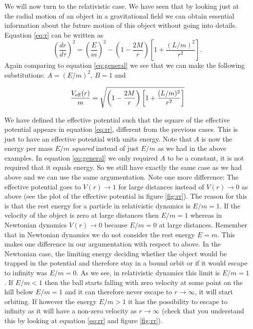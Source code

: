 \begin{multicols}{2}
We will now turn to the relativistic case. We have seen that by looking just at the radial motion of an object in a gravitational field we can obtain essential information about the future motion of this object without going into details. Equation \ref{eq:r} can be written as
\begin{equation}
\label{eq:rr}
\left(\frac{dr}{d\tau}\right)^2=\left(\frac{E}{m}\right)^2-\left(1-\frac{2M}{r}\right)\left[1+\frac{(L/m)^2}{r^2}\right].
\end{equation}
Again comparing to equation \ref{eq:general} we see that we can make the following substitutions: $A=(E/m)^2$, $B=1$ and
\begin{formbox}
\[
\frac{V_{\rm eff}(r)}{m}=\sqrt{\left(1-\frac{2M}{r}\right)\left[1+\frac{(L/m)^2}{r^2}\right]}
\]
\end{formbox}
We have defined the effective potential such that the square of the effective potential appears in equation \ref{eq:rr}, different from the previous cases. This is just to have an effective potential with units energy. Note that $A$ is now the energy per mass $E/m$ {\it squared} instead of just $E/m$ as we had in the above examples. In equation \ref{eq:general} we only required $A$ to be a constant, it is not required that it equals energy. So we still have exactly the same case as we had above and we can use the same argumentation. Note one more difference: The effective potential goes to $V(r)\rightarrow1$ for large distances instead of $V(r)\rightarrow0$ as above (see the plot of the effective potential in figure \ref{fig:rr}). The reason for this is that the rest energy for a particle in relativistic dynamics is $E/m=1$. If the velocity of the object is zero at large distances then $E/m=1$ whereas in Newtonian dynamics $V(r)\rightarrow0$ because $E/m=0$ at large distances. Remember that in Newtonian dynamics we do not consider the rest energy $E=m$. This makes one difference in our argumentation with respect to above. In the Newtonian case, the limiting energy deciding whether the object would be trapped in the potential and therefore stay in a bound orbit or if it would escape to infinity was $E/m=0$. As we see, in relativistic dynamics this limit is $E/m=1$. If $E/m<1$ then the ball starts falling with zero velocity at some point on the hill below $E/m=1$ and it can therefore never escape to $r\rightarrow\infty$, it will start orbiting. If however the energy $E/m>1$ it has the possibility to escape to infinity as it will have a non-zero velocity as $r\rightarrow\infty$ (check that you understand this by looking at equation \ref{eq:rr} and figure \ref{fig:rr}).



\end{multicols}
